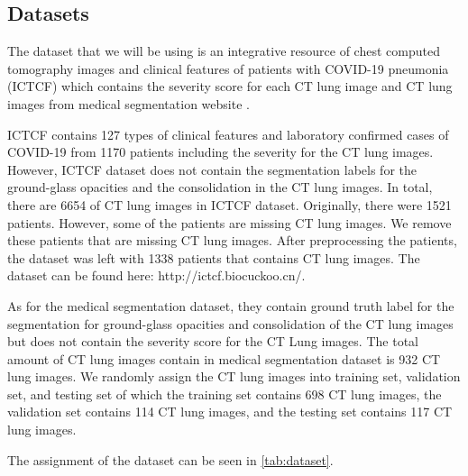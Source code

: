 \subsection{Datasets}
The dataset that we will be using is an integrative resource of chest computed tomography images and clinical features of patients with COVID-19 pneumonia (ICTCF) \cite{ref23} which contains the severity score for each CT lung image and CT lung images from medical segmentation website \cite{ref26}. 

ICTCF contains 127 types of clinical features and laboratory confirmed cases of COVID-19 from 1170 patients including the severity for the CT lung images. However, ICTCF dataset does not contain the segmentation labels for the ground-glass opacities and the consolidation in the CT lung images. In total, there are 6654 of CT lung images in ICTCF dataset. Originally, there were 1521 patients. However, some of the patients are missing CT lung images. We remove these patients that are missing CT lung images. After preprocessing the patients, the dataset was left with 1338 patients that contains CT lung images. The dataset can be found here: http://ictcf.biocuckoo.cn/. 

As for the medical segmentation dataset, they contain ground truth label for the segmentation for ground-glass opacities and consolidation of the CT lung images but does not contain the severity score for the CT Lung images. The total amount of CT lung images contain in medical segmentation dataset is 932 CT lung images. We randomly assign the CT lung images into training set, validation set, and testing set of which the training set contains 698 CT lung images, the validation set contains 114 CT lung images, and the testing set contains 117 CT lung images. 

The assignment of the dataset can be seen in \ref{tab:dataset}.


